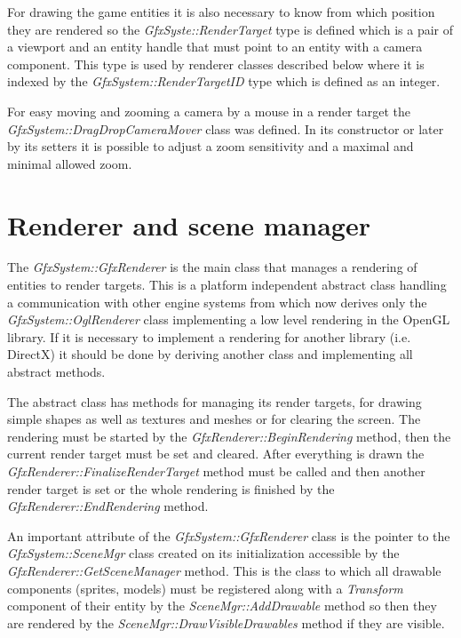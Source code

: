 For drawing the game entities it is also necessary to know from which position they are rendered so the \emph{GfxSyste::RenderTarget} type is defined which is a pair of a viewport and an entity handle that must point to an entity with a camera component. This type is used by renderer classes described below where it is indexed by the \emph{GfxSystem::RenderTargetID} type which is defined as an integer.

For easy moving and zooming a camera by a mouse in a render target the \emph{GfxSystem::DragDropCameraMover} class was defined. In its constructor or later by its setters it is possible to adjust a zoom sensitivity and a maximal and minimal allowed zoom.

\section{Renderer and scene manager}

The \emph{GfxSystem::GfxRenderer} is the main class that manages a rendering of entities to render targets. This is a platform independent abstract class handling a communication with other engine systems from which now derives only the \emph{GfxSystem::OglRenderer} class implementing a low level rendering in the OpenGL \cite{opengl} library. If it is necessary to implement a rendering for another library (i.e. DirectX) it should be done by deriving another class and implementing all abstract methods.

The abstract class has methods for managing its render targets, for drawing simple shapes as well as textures and meshes or for clearing the screen. The rendering must be started by the \emph{GfxRenderer::BeginRendering} method, then the current render target must be set and cleared. After everything is drawn the \emph{GfxRenderer::FinalizeRenderTarget} method must be called and then another render target is set or the whole rendering is finished by the \emph{GfxRenderer::EndRendering} method.

An important attribute of the \emph{GfxSystem::GfxRenderer} class is the point\-er to the \emph{GfxSystem::SceneMgr} class created on its initialization accessible by the \emph{GfxRenderer::GetSceneManager} method. This is the class to which all drawable components (sprites, models) must be registered along with a \emph{Transform} component of their entity by the \emph{SceneMgr::AddDrawable} method so then they are rendered by the \emph{SceneMgr::DrawVisibleDrawables} method if they are visible.

